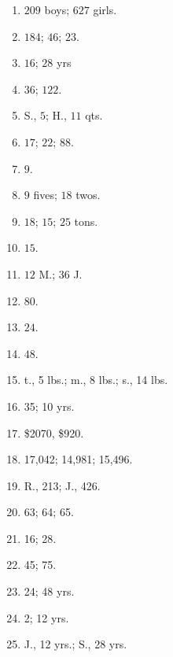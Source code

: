 \documentclass{book}
\begin{document}
\begin{enumerate}

\item $209$ boys; $627$ girls.

\item $184$; $46$; $23$.

\item $16$; $28$ yrs

\item $36$; $122$.

\item S., $5$; H., $11$ qts.

\item $17$; $22$; $88$.

\item $9$.

\item $9$ fives; $18$ twos.

\item $18$; $15$; $25$ tons.

\item $15$.

\item $12$ M.; $36$ J.

\item $80$.

\item $24$.

\item $48$.

\item  t., 5 lbs.; m., 8 lbs.; s., 14 lbs.

\item  35; 10 yrs.

\item  \$2070, \$920.

\item  17,042; 14,981; 15,496.

\item  R., 213; J., 426.

\item  63; 64; 65.

\item  16; 28.

\item  45; 75.

\item  24; 48 yrs.

\item  2; 12 yrs.

\item  J., 12 yrs.; S., 28 yrs.


\end{enumerate}
\end{document}
